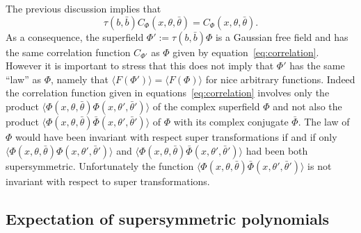 \documentclass[a4paper,10pt]{article}
\newcommand{\assign}{:=}
\begin{document}
\begin{remark}
  \label{remark_supersymmetry}The previous discussion implies that
  \begin{equation}
    \tau (b, \bar{b}) C_{\Phi} (x, \theta, \bar{\theta}) = C_{\Phi} (x,
    \theta, \bar{\theta}) . \label{eq:invariance}
  \end{equation}
  As a consequence, the superfield $\Phi' \assign \tau (b, \bar{b}) \Phi$ is a
  Gaussian free field and has the same correlation function $C_{\Phi'}$ as
  $\Phi$ given by equation~{\eqref{eq:correlation}}. However it is important
  to stress that this does not imply that $\Phi'$ has the same ``law'' as
  $\Phi$, namely that $\langle F (\Phi') \rangle = \langle F (\Phi) \rangle$
  for nice arbitrary functions. Indeed the correlation function given in
  equations~{\eqref{eq:correlation}} involves only the product $\langle \Phi
  (x, \theta, \bar{\theta}) \Phi (x, \theta', \bar{\theta}') \rangle$ of the
  complex superfield $\Phi$ and not also the product $\langle \Phi (x, \theta,
  \bar{\theta}) \bar{\Phi} (x, \theta', \bar{\theta}') \rangle$ of $\Phi$ with
  its complex conjugate $\bar{\Phi}$. The law of $\Phi$ would have been
  invariant with respect super transformations if and if only $\langle \Phi
  (x, \theta, \bar{\theta}) \Phi (x, \theta', \bar{\theta}') \rangle$ and
  $\langle \Phi (x, \theta, \bar{\theta}) \bar{\Phi} (x, \theta',
  \bar{\theta}') \rangle$ had been both supersymmetric. Unfortunately the
  function $\langle \Phi (x, \theta, \bar{\theta}) \bar{\Phi} (x, \theta',
  \bar{\theta}') \rangle$ is not invariant with respect to super
  transformations.
\end{remark}

\subsection{Expectation of supersymmetric polynomials}
\end{document}
